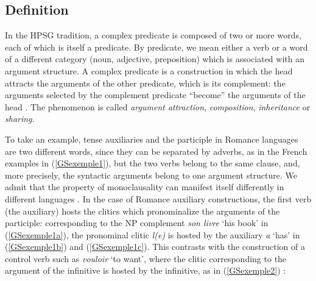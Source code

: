 {%

\subsection{Definition}\label{GSsection1.1}

In the HPSG tradition, a complex predicate is composed of two or more words, each of which is itself a predicate. By predicate, we mean either a verb or a word of a different category (noun, adjective, preposition) which is associated with an argument structure. A complex predicate is a construction in which the head attracts the arguments of the other predicate, which is its complement: the arguments selected by the complement predicate ``become'' the arguments of the head \citep{HN89b, HN98a}. The phenomenon is called \emph{argument attraction}, \emph{composition}, \emph{inheritance} or \emph{sharing}.

To take an example, tense auxiliaries and the participle in Romance languages are two different words, since they can be separated by adverbs, as in the French examples in (\ref{GSexemple1}), but the two verbs belong to the same clause, and, more precisely, the syntactic arguments belong to one argument structure. We admit that the property of monoclausality can manifest itself differently in different languages \citep{Butt2010a}. In the case of Romance auxiliary constructions, the first verb (the auxiliary) hosts the clitics which pronominalize the arguments of the participle: corresponding to the NP complement \emph{son livre} `his book' in (\ref{GSexemple1a}), the pronominal clitic \emph{l(e)} is hosted by the auxiliary \emph{a} `has' in (\ref{GSexemple1b}) and (\ref{GSexemple1c}). This contrasts with the construction of a control verb such as \emph{vouloir} `to want', where the clitic corresponding to the argument of the infinitive is hosted by the infinitive, as in (\ref{GSexemple2}) \citep[from][406]{AG2002b-u}: 

\eal 
	\label{GSexemple1} 
	\label{GSexemple1a} 
		
	\label{GSexemple1b}  
		
}
